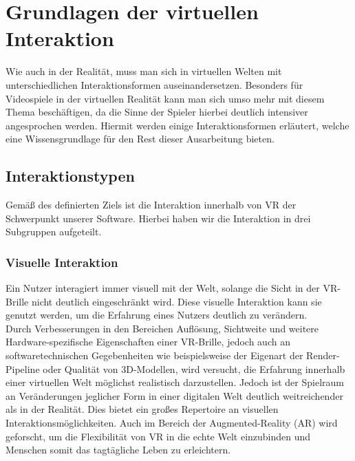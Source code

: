 \chapter{Grundlagen der virtuellen Interaktion}
Wie auch in der Realität, muss man sich in virtuellen Welten mit unterschiedlichen Interaktionsformen auseinandersetzen. Besonders für Videospiele in der virtuellen Realität kann man sich umso mehr mit diesem Thema beschäftigen, da die Sinne der Spieler hierbei deutlich intensiver angesprochen werden. Hiermit werden einige Interaktionsformen erläutert, welche eine Wissensgrundlage für den Rest dieser Ausarbeitung bieten.

\section{Interaktionstypen}
Gemäß des definierten Ziels ist die Interaktion innerhalb von VR der Schwerpunkt unserer Software. Hierbei haben wir die Interaktion in drei Subgruppen aufgeteilt.

\subsection{Visuelle Interaktion}
Ein Nutzer interagiert immer visuell mit der Welt, solange die Sicht in der VR-Brille nicht deutlich eingeschränkt wird. Diese visuelle Interaktion kann sie genutzt werden, um die Erfahrung eines Nutzers deutlich zu verändern.\\
\noindent Durch Verbesserungen in den Bereichen Auflösung, Sichtweite und weitere Hardware-spezifische Eigenschaften einer VR-Brille, jedoch auch an softwaretechnischen Gegebenheiten wie beispiels\-weise der Eigenart der Render-Pipeline oder Qualität von 3D-Modellen, wird versucht, die Erfahrung innerhalb einer virtuellen Welt möglichst realistisch darzustellen. Jedoch ist der Spielraum an Veränderungen jeglicher Form in einer digitalen Welt deutlich weitreichender als in der Realität. Dies bietet ein großes Repertoire an visuellen Interaktionsmöglichkeiten. Auch im Bereich der Augmented-Reality (AR) wird geforscht, um die Flexibilität von VR in die echte Welt einzubinden und Menschen somit das tagtägliche Leben zu erleichtern.

